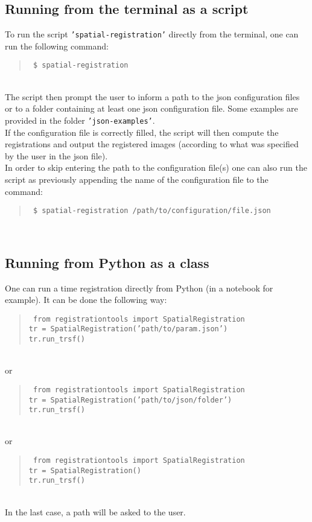 \documentclass[10pt,a4paper]{book}
\newcommand{\option}[1]{{\texttt{'#1'}}}
\newenvironment{code}[1]{\mbox{}\\[1ex]\hspace*{-#1cm}\begin{minipage}{150mm}\begin{quote}\tt}{\end{quote}\end{minipage}\mbox{}\\[1ex]}
\begin{document}
\subsection{Running from the terminal as a script}
To run the script \option{spatial-registration} directly from the terminal, one can run the following command:
\begin{code}{0.8}
\$ spatial-registration
\end{code}
The script then prompt the user to inform a path to the json configuration files or to a folder containing at least one json configuration file. Some examples are provided in the folder \option{json-examples}.\\
If the configuration file is correctly filled, the script will then compute the registrations and output the registered images (according to what was specified by the user in the json file).\\
In order to skip entering the path to the configuration file(s) one can also run the script as previously appending the name of the configuration file to the command:
\begin{code}{0.8}
\$ spatial-registration /path/to/configuration/file.json
\end{code}

\subsection{Running from Python as a class}
One can run a time registration directly from Python (in a notebook for example). It can be done the following way:
\begin{code}{0.8}
from registrationtools import SpatialRegistration\\
tr = SpatialRegistration('path/to/param.json')\\
tr.run\_trsf()
\end{code}
or
\begin{code}{0.8}
from registrationtools import SpatialRegistration\\
tr = SpatialRegistration('path/to/json/folder')\\
tr.run\_trsf()
\end{code}
or
\begin{code}{0.8}
from registrationtools import SpatialRegistration\\
tr = SpatialRegistration()\\
tr.run\_trsf()
\end{code}
In the last case, a path will be asked to the user.
\end{document}
